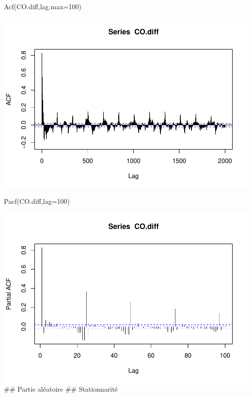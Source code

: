\documentclass[
]{article}
\newenvironment{Shaded}{\begin{snugshade}}{\end{snugshade}}
\newcommand{\AttributeTok}[1]{\textcolor[rgb]{0.77,0.63,0.00}{#1}}
\newcommand{\DecValTok}[1]{\textcolor[rgb]{0.00,0.00,0.81}{#1}}
\newcommand{\FunctionTok}[1]{\textcolor[rgb]{0.00,0.00,0.00}{#1}}
\newcommand{\NormalTok}[1]{#1}
\begin{document}
\begin{Shaded}
\begin{Highlighting}[]
\FunctionTok{Acf}\NormalTok{(CO.diff,}\AttributeTok{lag.max=}\DecValTok{100}\NormalTok{)}
\end{Highlighting}
\end{Shaded}

\includegraphics{STA202_report_files/figure-latex/unnamed-chunk-10-1.pdf}

\begin{Shaded}
\begin{Highlighting}[]
\FunctionTok{Pacf}\NormalTok{(CO.diff,}\AttributeTok{lag=}\DecValTok{100}\NormalTok{)}
\end{Highlighting}
\end{Shaded}

\includegraphics{STA202_report_files/figure-latex/unnamed-chunk-10-2.pdf}
\#\# Partie aléatoire \#\# Stationnarité
\end{document}
